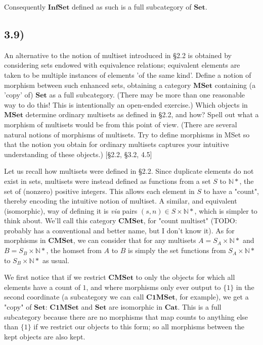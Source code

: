 \documentclass[12pt, letterpaper, twoside]{report}
\begin{document}
Consequently $\mathbf{InfSet}$ defined as such is a full subcategory of $\mathbf{Set}$.


\subsection*{3.9)}

An alternative to the notion of multiset introduced in §2.2 is obtained by considering sets endowed with equivalence relations; equivalent elements are taken to be multiple instances of elements 'of the same kind'. Define a notion of morphism between such enhanced sets, obtaining a category $\mathbf{MSet}$ containing (a 'copy' of) $\mathbf{Set}$ as a full subcategory. (There may be more than one reasonable way to do this! This is intentionally an open-ended exercise.) Which objects in $\mathbf{MSet}$ determine ordinary multisets as defined in §2.2, and how? Spell out what a morphism of multisets would be from this point of view. (There are several natural notions of morphisms of multisets. Try to define morphisms in MSet so that the notion you obtain for ordinary multisets captures your intuitive understanding of these objects.) [§2.2, §3.2, 4.5]

Let us recall how multisets were defined in §2.2. Since duplicate elements do not exist in sets, multisets were instead defined as functions from a set $S$ to $\mathbb{N}*$, the set of (nonzero) positive integers. This allows each element in $S$ to have a "count", thereby encoding the intuitive notion of multiset. A similar, and equivalent (isomorphic), way of defining it is \textit{via} pairs $(s, n) \in S \times \mathbb{N}*$, which is simpler to think about. We'll call this category $\mathbf{CMSet}$, for "count multiset" (TODO: probably has a conventional and better name, but I don't know it). As for morphisms in $\mathbf{CMSet}$, we can consider that for any multisets $A = S_A \times \mathbb{N}*$ and $B = S_B \times \mathbb{N}*$, the homset from $A$ to $B$ is simply the set functions from $S_A \times \mathbb{N}*$ to $S_B \times \mathbb{N}*$ as usual.

We first notice that if we restrict $\mathbf{CMSet}$ to only the objects for which all elements have a count of $1$, and where morphisms only ever output to $\{ 1 \}$ in the second coordinate (a subcategory we can call $\mathbf{C1MSet}$, for example), we get a "copy" of $\mathbf{Set}$: $\mathbf{C1MSet}$ and $\mathbf{Set}$ are isomorphic in $\mathbf{Cat}$. This is a full subcategory because there are no morphisms that map counts to anything else than $\{ 1 \}$ if we restrict our objects to this form; so all morphisms between the kept objects are also kept. 
\end{document}
